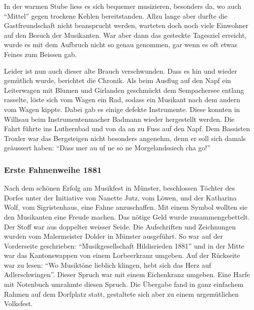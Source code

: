 \begin{history}
    In der warmen Stube liess es sich bequemer musizieren, besonders da, wo auch
    \enquote{Mittel} gegen trockene Kehlen bereitstanden. Allzu lange aber
    durfte die Gastfreundschaft nicht beansprucht werden, warteten doch noch
    viele Einwohner auf den Besuch der Musikanten. War aber dann das gesteckte
    Tagesziel erreicht, wurde es mit dem Aufbruch nicht so genau genommen, gar
    wenn es oft etwas Feines zum Beissen gab.

    Leider ist nun auch dieser alte Brauch verschwunden. Dass es hin und wieder
    gemütlich wurde, berichtet die Chronik. Als beim Ausflug auf den Napf ein
    Leiterwagen mit Blumen und Girlanden geschmückt dem Sempachersee entlang
    rasselte, löste sich vom Wagen ein Rad, sodass ein Musikant nach dem andern
    vom Wagen kippte. Dabei gab es einige defekte Instrumente. Diese konnten in
    Willisau beim Instrumentenmacher Badmann wieder hergestellt werden. Die
    Fahrt führte ins Luthernbad und von da an zu Fuss auf den Napf. Dem
    Bassisten Troxler war das Bergsteigen nicht besonders angenehm, denn er soll
    sich damals geäussert haben: \enquote{Dass mer au uf ne so ne
        Morgelandssiech cha go!}

    \subsubsection*{Erste Fahnenweihe 1881}

    Nach dem schönen Erfolg am Musikfest in Münster, beschlossen Töchter des
    Dorfes unter der Initiative von Nanette Jutz, vom Löwen, und der Katharina
    Wolf, vom Sigristenhaus, eine Fahne anzuschaffen. Mit einem Symbol wollten
    sie den Musikanten eine Freude machen. Das nötige Geld wurde
    zusammengebettelt. Der Stoff war aus doppelter weisser Seide. Die
    Aufschriften und Zeichnungen wurden vom Malermeister Dolder in Münster
    ausgeführt. So war auf der Vorderseite geschrieben:
    \enquote{Musikgesellschaft Hildisrieden 1881} und in der Mitte war das
    Kantonswappen von einem Lorbeerkranz umgeben. Auf der Rückseite war zu
    lesen: \enquote{Wo Musiktöne lieblich klingen, hebt sich das Herz auf
        Adlerschwingen}. Dieser Spruch war mit einem Eichenkranz umgeben. Eine Harfe
    mit Notenbuch umrahmte diesen Spruch. Die Übergabe fand in ganz einfachem
    Rahmen auf dem Dorfplatz statt, gestaltete sich aber zu einem urgemütlichen
    Volksfest.

\end{history}


